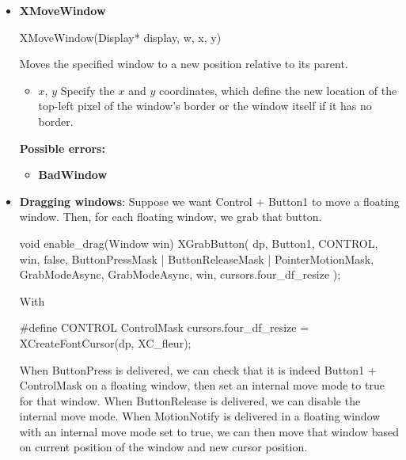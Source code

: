 \documentclass{report}
\begin{document}
\begin{itemize}
\begin{itemize}
                \item \textbf{Status identifiers}:
                    \begin{itemize}
                        \item \textbf{0}: Failure.
                        \item \textbf{Nonzero}: Success.
                    \end{itemize}
            \end{itemize}
        \item \textbf{XMoveWindow}
            \bigbreak \noindent 
            \begin{cppcode}
                XMoveWindow(Display* display, w, x, y)
            \end{cppcode}
            \bigbreak \noindent
            Moves the specified window to a new position relative to its parent.
            \begin{itemize}
                \item $x$, $y$ Specify the $x$ and $y$ coordinates, which define the new location of the top-left pixel of the window’s border or the window itself if it has no border.
            \end{itemize}
            \bigbreak \noindent
            \textbf{Possible errors:}
            \begin{itemize}
                \item \textbf{BadWindow}
            \end{itemize}

        \item \textbf{Dragging windows}: Suppose we want Control + Button1 to move a floating window. Then, for each floating window, we grab that button. 
            \bigbreak \noindent 
            \begin{cppcode}
                void enable_drag(Window win) {
                    XGrabButton(
                        dp, 
                        Button1,
                        CONTROL,
                        win, 
                        false,
                        ButtonPressMask | ButtonReleaseMask | PointerMotionMask,
                        GrabModeAsync,
                        GrabModeAsync, 
                        win, 
                        cursors.four_df_resize
                    );
                }
            \end{cppcode}
            \bigbreak \noindent 
            With
            \bigbreak \noindent 
            \begin{cppcode}
            #define CONTROL ControlMask
            cursors.four_df_resize = XCreateFontCursor(dp, XC_fleur);
            \end{cppcode}
            \bigbreak \noindent 
            When ButtonPress is delivered, we can check that it is indeed Button1 + ControlMask on a floating window, then set an internal move mode to true for that window. When ButtonRelease is delivered, we can disable the internal move mode.
            \bigbreak \noindent 
            When MotionNotify is delivered in a floating window with an internal move mode set to true, we can then move that window based on current position of the window and new cursor position.



\end{itemize}
\end{document}
